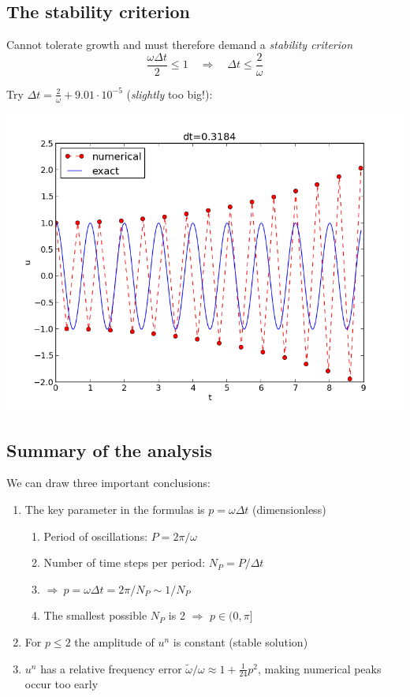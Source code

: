 \documentclass[%
oneside,                 %
final,                   %
10pt]{article}
\begin{document}
\noindent
\subsection*{The stability criterion}


Cannot tolerate growth and must therefore demand a \emph{stability criterion}
\[
\frac{\omega\Delta t}{2} \leq 1\quad\Rightarrow\quad
\Delta t \leq \frac{2}{\omega}
\]

Try $\Delta t = \frac{2}{\omega} + 9.01\cdot 10^{-5}$ (\emph{slightly} too big!):



\centerline{\includegraphics[width=0.8\linewidth]{fig-vib/vib_unstable.png}}



\subsection*{Summary of the analysis}

We can draw three important conclusions:

\begin{enumerate}
\item The key parameter in the formulas is $p=\omega\Delta t$ (dimensionless)
\begin{enumerate}

  \item Period of oscillations: $P=2\pi/\omega$

  \item Number of time steps per period: $N_P=P/\Delta t$

  \item $\Rightarrow\ p=\omega\Delta t = 2\pi/ N_P \sim 1/N_P$

  \item The smallest possible $N_P$ is 2 $\Rightarrow$ $p\in (0,\pi]$

\end{enumerate}

\noindent
\item For $p\leq 2$ the amplitude of $u^n$ is constant (stable solution)

\item $u^n$ has a relative frequency error
   $\tilde\omega/\omega \approx 1 + \frac{1}{24}p^2$, making numerical
   peaks occur too early
\end{enumerate}
\end{document}
